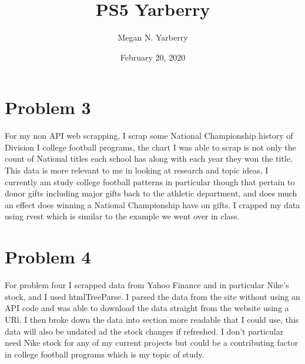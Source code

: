 \documentclass{article}
\title{PS5 Yarberry}
\author{Megan N. Yarberry }
\date{February 20, 2020}
\begin{document}
\maketitle

\section{Problem 3}
For my non API web scrapping, I scrap some National Championship history of Division I college football programs, the chart I was able to scrap is not only the count of National titles each school has along with each year they won the title. This data is more relevant to me in looking at research and topic ideas, I currently am study college football patterns in particular though that pertain to donor gifts including major gifts back to the athletic department, and does much an effect does winning a National Championship have on gifts. I crapped my data using rvest which is similar to the example we went over in class. 

\section{Problem 4}
For problem four I scrapped data from Yahoo Finance and in particular Nike's stock, and I used htmlTreeParse. I parsed the data from the site without using an API code and was able to download the data straight from the website using a URl. I then broke down the data into section more readable that I could use, this data will also be undated ad the stock changes if refreshed. I don't particular need Nike stock for any of my current projects but could be a contributing factor in college football programs which is my topic of study. 
\end{document}
